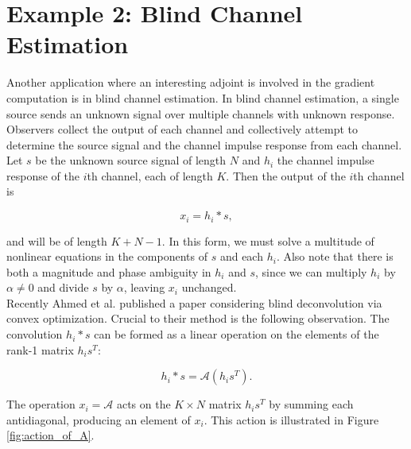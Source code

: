 \documentclass[journal]{IEEEtran}
\begin{document}


\section{Example 2: Blind Channel Estimation}
Another application where an interesting adjoint is involved in the gradient computation is in blind channel estimation.  In blind channel estimation, a single source sends an unknown signal over multiple channels with unknown response.  Observers collect the output of each channel and collectively attempt to determine the source signal and the channel impulse response from each channel.  Let $s$ be the unknown source signal of length $N$ and $h_i$ the channel impulse response of the $i$th channel, each of length $K$.  Then the output of the $i$th channel is

\[ x_i = h_i\ast s, \] 

\noindent and will be of length $K+N-1$.  In this form, we must solve a multitude of nonlinear equations in the components of $s$ and each $h_i$.  Also note that there is both a magnitude and phase ambiguity in $h_i$ and $s$, since we can multiply $h_i$ by $\alpha\neq 0$ and divide $s$ by $\alpha$, leaving $x_i$ unchanged.\\

Recently Ahmed et al. \cite{ahmed_2013} published a paper considering blind deconvolution via convex optimization.  Crucial to their method is the following observation.  The convolution $h_i\ast s$ can be formed as a linear operation on the elements of the rank-1 matrix $h_is^T$:

\[ h_i\ast s = \mathcal{A}(h_is^T). \] 

\noindent The operation $x_i=\mathcal{A}$ acts on the $K\times N$ matrix $h_is^T$ by summing each antidiagonal, producing an element of $x_i$.  This action is illustrated in Figure \ref{fig:action_of_A}.\\
\end{document}
